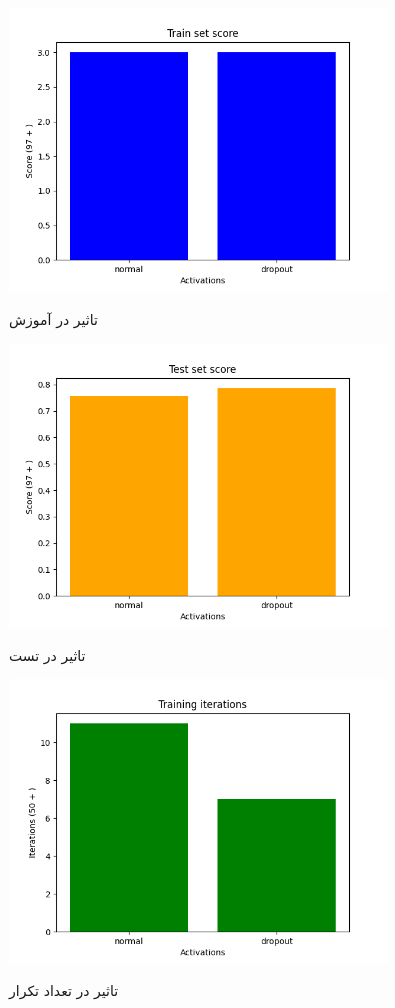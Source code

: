 \documentclass[12pt, dvipsnames, svgnames, x11names,]{article}
\begin{document}
	
		\begin{figure}
			\begin{center}
				{\includegraphics[width=10cm]{images/14.png}}
			\end{center}
			\caption{تاثیر  در آموزش}
			\label{fig:dropout:train}
		\end{figure}
		
		\begin{figure}
			\begin{center}
				{\includegraphics[width=10cm]{images/15.png}}
			\end{center}
			\caption{تاثیر  در تست}
			\label{fig:dropout:test}
		\end{figure}
		
		\begin{figure}
			\begin{center}
				{\includegraphics[width=10cm]{images/16.png}}
			\end{center}
			\caption{تاثیر  در تعداد تکرار}
			\label{fig:dropout:iteration}
		\end{figure}
		
\end{document}
